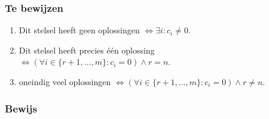 \documentclass[lineaire_algebra_oplossingen.tex]{subfiles}
\begin{document}
\subsubsection*{Te bewijzen}
\begin{enumerate}
\item Dit stelsel heeft geen oplossingen $\Leftrightarrow \exists i: c_i \neq 0$.
\item Dit stelsel heeft precies \'e\'en oplossing $\Leftrightarrow (\forall i \in \{r+1,...,m\}: c_i=0) \wedge r=n$. 
\item oneindig veel oplossingen $\Leftrightarrow (\forall i \in \{r+1,...,m\}: c_i=0) \wedge r\neq n$.
\end{enumerate}

\subsubsection*{Bewijs}
\end{document}
